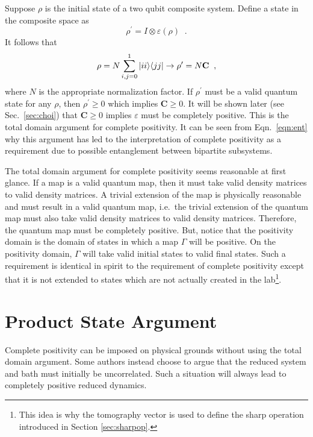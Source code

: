 Suppose $\rho$ is the initial state of a two qubit composite system.  Define a state in the composite space as
 \begin{equation}
\rho^\prime = I\otimes\varepsilon\left(\rho\right)\;\;.
\end{equation}
It follows that
\begin{equation}
\label{eqn:ent}
\rho = N\sum_{i,j=0}^1|ii\rangle\langle jj| \rightarrow \rho^\prime = N\mathbf{C}\;\;,
\end{equation}
 where $N$ is the appropriate normalization factor.  If $\rho^\prime$ must be a valid quantum state for any $\rho$, then $\rho^\prime\ge 0$ which implies $\mathbf{C}\ge 0$.  It will be shown later (see Sec.\ \ref{sec:choi}) that $\mathbf{C}\ge 0$ implies $\varepsilon$ must be completely positive.  This is the total domain argument for complete positivity.  It can be seen from Eqn.\ \ref{eqn:ent} why this argument has led to the interpretation of complete positivity as a requirement due to possible entanglement between bipartite subsystems.

The total domain argument for complete positivity seems reasonable at first glance.  If a map is a valid quantum map, then it must take valid density matrices to valid density matrices.  A trivial extension of the map is physically reasonable and must result in a valid quantum map, i.e.\ the trivial extension of the quantum map must also take valid density matrices to valid density matrices.  Therefore, the quantum map must be completely positive.  But, notice that the positivity domain is the domain of states in which a map $\Gamma$ will be positive.  On the positivity domain, $\Gamma$ will take valid initial states to valid final states.  Such a requirement is identical in spirit to the requirement of complete positivity except that it is not extended to states which are not actually created in the lab\footnote{This idea is why the tomography vector is used to define the sharp operation introduced in Section \ref{sec:sharpop}.}. 

\section{Product State Argument}

Complete positivity can be imposed on physical grounds without using the total domain argument.  Some authors instead choose to argue that the reduced system and bath must initially be uncorrelated.  Such a situation will always lead to completely positive reduced dynamics. 

